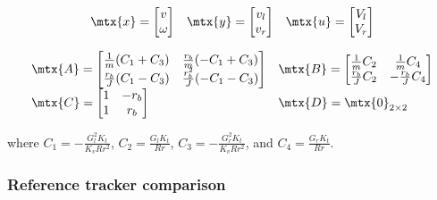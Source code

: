 \begin{theorem}
  \label{thm:ramsete_coupled_ref_tracker}
  \begin{equation*}
    \begin{array}{ccc}
      \mtx{x} =
      \begin{bmatrix}
        v \\
        \omega
      \end{bmatrix} &
      \mtx{y} =
      \begin{bmatrix}
        v_l \\
        v_r
      \end{bmatrix} &
      \mtx{u} =
      \begin{bmatrix}
        V_l \\
        V_r
      \end{bmatrix}
    \end{array}
  \end{equation*}

  \begin{equation}
    \begin{array}{ll}
      \mtx{A} =
      \begin{bmatrix}
        \frac{1}{m}(C_1 + C_3) & \frac{r_b}{m}(-C_1 + C_3) \\
        \frac{r_b}{J}(C_1 - C_3) & \frac{r_b^2}{J}(-C_1 - C_3)
      \end{bmatrix} &
      \mtx{B} =
      \begin{bmatrix}
        \frac{1}{m}C_2 & \frac{1}{m}C_4 \\
        \frac{r_b}{J}C_2 & -\frac{r_b}{J}C_4
      \end{bmatrix} \\
      \mtx{C} =
      \begin{bmatrix}
        1 & -r_b \\
        1 & r_b
      \end{bmatrix} &
      \mtx{D} = \mtx{0}_{2 \times 2}
    \end{array}
  \end{equation}

  where $C_1 = -\frac{G_l^2 K_t}{K_v R r^2}$, $C_2 = \frac{G_l K_t}{Rr}$,
  $C_3 = -\frac{G_r^2 K_t}{K_v R r^2}$, and $C_4 = \frac{G_r K_t}{Rr}$.
\end{theorem}

\subsubsection{Reference tracker comparison}

